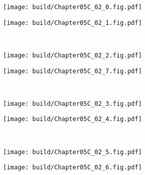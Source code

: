 \clearpage

\begin{Figure}[五管运算跨导放大器的共模特性]
    \begin{FigureSub}
        \texttt{[image: build/Chapter05C\_02\_0.fig.pdf]}
    \end{FigureSub} \hspace{0.2cm}
    \begin{FigureSub}
        \texttt{[image: build/Chapter05C\_02\_1.fig.pdf]}
    \end{FigureSub} \\ \vspace{0.5cm}
    \begin{FigureSub}
        \texttt{[image: build/Chapter05C\_02\_2.fig.pdf]}
    \end{FigureSub} \hspace{0.2cm}
    \begin{FigureSub}[$M_5$管;五管共模5]
        \texttt{[image: build/Chapter05C\_02\_7.fig.pdf]}
    \end{FigureSub} \\ \vspace{0.5cm}
    \begin{FigureSub}[$M_1$管;五管共模1]
        \texttt{[image: build/Chapter05C\_02\_3.fig.pdf]}
    \end{FigureSub} \hspace{0.2cm}
    \begin{FigureSub}[$M_2$管;五管共模2]
        \texttt{[image: build/Chapter05C\_02\_4.fig.pdf]}
    \end{FigureSub} \\ \vspace{0.5cm}
    \begin{FigureSub}[$M_3$管;五管共模3]
        \texttt{[image: build/Chapter05C\_02\_5.fig.pdf]}
    \end{FigureSub} \hspace{0.2cm}
    \begin{FigureSub}[$M_4$管;五管共模4]
        \texttt{[image: build/Chapter05C\_02\_6.fig.pdf]}
    \end{FigureSub}
\end{Figure}

